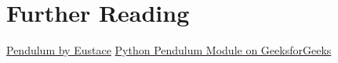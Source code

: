 \section{Further Reading}

\nocite{Abadi:2016}
\href{https://pendulum.eustace.io/}{Pendulum by Eustace}
\href{https://www.geeksforgeeks.org/python-pendulum-module/}{Python Pendulum Module on GeeksforGeeks}
   \printbibliography[heading=subbibliography, segment=\therefsegment]










